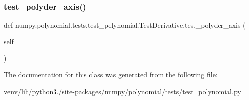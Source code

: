 \mbox{\label{classnumpy_1_1polynomial_1_1tests_1_1test__polynomial_1_1TestDerivative_ac707d0f7c6abafc5574dfee26f7a755e}} 
\subsubsection{\texorpdfstring{test\+\_\+polyder\+\_\+axis()}{test\_polyder\_axis()}}
{\footnotesize\ttfamily def numpy.\+polynomial.\+tests.\+test\+\_\+polynomial.\+Test\+Derivative.\+test\+\_\+polyder\+\_\+axis (\begin{DoxyParamCaption}\item[{}]{self }\end{DoxyParamCaption})}



The documentation for this class was generated from the following file\+:\begin{DoxyCompactItemize}
\item 
venv/lib/python3./site-\/packages/numpy/polynomial/tests/\hyperlink{polynomial_2tests_2test__polynomial_8py}{test\+\_\+polynomial.\+py}\end{DoxyCompactItemize}
